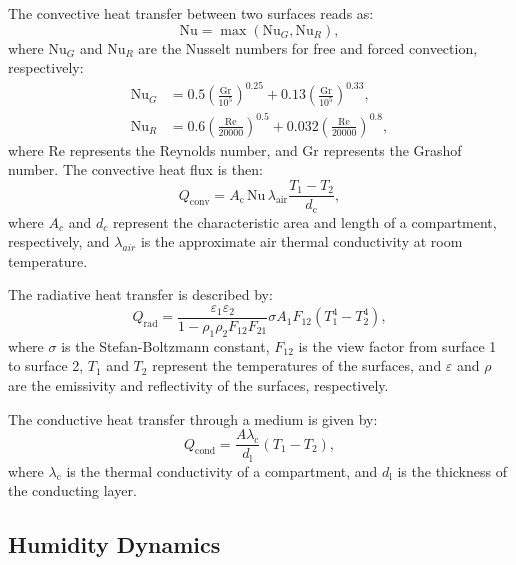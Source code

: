 \documentclass[conference]{IEEEtran}
\begin{document}
The convective heat transfer between two surfaces reads as:
\begin{equation}
    \text{Nu} = \max \left( \text{Nu}_G, \text{Nu}_R \right),
\end{equation}
where \(\text{Nu}_G\) and \(\text{Nu}_R\) are the Nusselt numbers for free and forced convection, respectively:
\begin{align}
    \text{Nu}_G & = 0.5  {\left( \frac{\text{Gr}}{10^5} \right)}^{0.25} + 0.13  {\left(\frac{\text{Gr}}{10^5}\right)}^{0.33}, \\
    \text{Nu}_R & = 0.6  {\left(\frac{\text{Re}}{20000}\right)}^{0.5} + 0.032  {\left(\frac{\text{Re}}{20000}\right)}^{0.8},
\end{align}
where Re represents the Reynolds number, and Gr represents the Grashof number. The convective heat flux is then:
\begin{equation}
    Q_{\text{conv}} = A_{\text{c}}\, \text{Nu}\, \lambda_{\text{air}} \frac{T_1 - T_2}{d_{\text{c}}},
\end{equation}
where \(A_c\) and \(d_c\) represent the characteristic area and length of a compartment, respectively, and \(\lambda_{air}\) is the approximate air thermal conductivity at room temperature.

The radiative heat transfer is described by:
\begin{equation}
    Q_{\text{rad}} = \frac{\varepsilon_1  \varepsilon_2}{1 - \rho_1  \rho_2  F_{12}  F_{21}}  \sigma  A_1  F_{12}  \left( T_1^4 - T_2^4 \right),
\end{equation}
where \(\sigma \) is the Stefan-Boltzmann constant, \(F_{12}\) is the view factor from surface 1 to surface 2, \(T_1\) and \(T_2\) represent the temperatures of the surfaces, and \(\varepsilon \) and \(\rho \) are the emissivity and reflectivity of the surfaces, respectively.

The conductive heat transfer through a medium is given by:
\begin{equation}
    Q_{\text{cond}} = \frac{A \lambda_{\text{c}}}{d_\text{l}} (T_1 - T_2),
\end{equation}
where \(\lambda_{\text{c}} \) is the thermal conductivity of a compartment, and \(d_{\text{l}}\) is the thickness of the conducting layer.

\subsection{Humidity Dynamics}\label{subsec:humidity}
\end{document}
